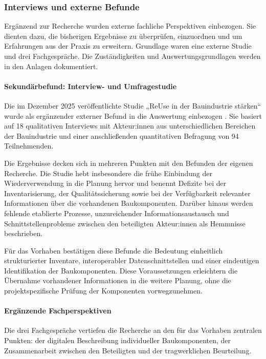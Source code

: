 \documentclass[type=zwischenbericht,theme=dark]{zukunftbau}
\begin{document}
\subsubsection{Interviews und externe Befunde}
Ergänzend zur Recherche wurden externe fachliche Perspektiven einbezogen. Sie dienten dazu, die bisherigen Ergebnisse zu überprüfen, einzuordnen und um Erfahrungen aus der Praxis zu erweitern. Grundlage waren eine externe Studie und drei Fachgespräche. Die Zuständigkeiten und Auswertungsgrundlagen werden in den Anlagen dokumentiert.

\begin{SemioNest}
\paragraph{Sekundärbefund: Interview- und Umfragestudie}
Die im Dezember 2025 veröffentlichte Studie „ReUse in der Bauindustrie stärken“ wurde als ergänzender externer Befund in die Auswertung einbezogen \cite{baselcircular-reuse-2025}. Sie basiert auf 18 qualitativen Interviews mit Akteur:innen aus unterschiedlichen Bereichen der Bauindustrie und einer anschließenden quantitativen Befragung von 94 Teilnehmenden.

Die Ergebnisse decken sich in mehreren Punkten mit den Befunden der eigenen Recherche. Die Studie hebt insbesondere die frühe Einbindung der Wiederverwendung in die Planung hervor und benennt Defizite bei der Inventarisierung, der Qualitätssicherung sowie bei der Verfügbarkeit relevanter Informationen über die vorhandenen Baukomponenten. Darüber hinaus werden fehlende etablierte Prozesse, unzureichender Informationsaustausch und Schnittstellenprobleme zwischen den beteiligten Akteur:innen als Hemmnisse beschrieben.

Für das Vorhaben bestätigen diese Befunde die Bedeutung einheitlich strukturierter Inventare, interoperabler Datenschnittstellen und einer eindeutigen Identifikation der Baukomponenten. Diese Voraussetzungen erleichtern die Übernahme vorhandener Informationen in die weitere Planung, ohne die projektspezifische Prüfung der Komponenten vorwegzunehmen.

\paragraph{Ergänzende Fachperspektiven}
Die drei Fachgespräche vertiefen die Recherche an den für das Vorhaben zentralen Punkten: der digitalen Beschreibung individueller Baukomponenten, der Zusammenarbeit zwischen den Beteiligten und der tragwerklichen Beurteilung.


\end{SemioNest}
\end{document}
